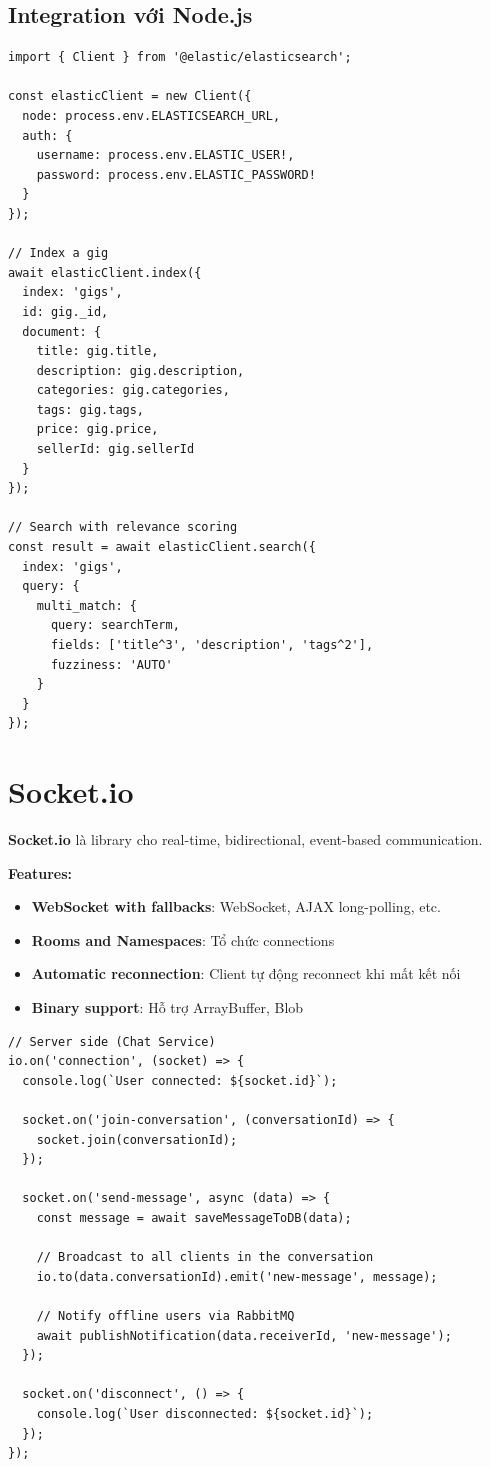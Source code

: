 \documentclass[12pt]{extreport}
\begin{document}
\subsection{Integration với Node.js}

\begin{lstlisting}[style=TypeScriptStyle, caption={Elasticsearch Client}]
import { Client } from '@elastic/elasticsearch';

const elasticClient = new Client({
  node: process.env.ELASTICSEARCH_URL,
  auth: {
    username: process.env.ELASTIC_USER!,
    password: process.env.ELASTIC_PASSWORD!
  }
});

// Index a gig
await elasticClient.index({
  index: 'gigs',
  id: gig._id,
  document: {
    title: gig.title,
    description: gig.description,
    categories: gig.categories,
    tags: gig.tags,
    price: gig.price,
    sellerId: gig.sellerId
  }
});

// Search with relevance scoring
const result = await elasticClient.search({
  index: 'gigs',
  query: {
    multi_match: {
      query: searchTerm,
      fields: ['title^3', 'description', 'tags^2'],
      fuzziness: 'AUTO'
    }
  }
});
\end{lstlisting}

\section{Socket.io}

\textbf{Socket.io} là library cho real-time, bidirectional, event-based communication.

\textbf{Features:}
\begin{itemize}
    \item \textbf{WebSocket with fallbacks}: WebSocket, AJAX long-polling, etc.
    \item \textbf{Rooms and Namespaces}: Tổ chức connections
    \item \textbf{Automatic reconnection}: Client tự động reconnect khi mất kết nối
    \item \textbf{Binary support}: Hỗ trợ ArrayBuffer, Blob
\end{itemize}

\begin{lstlisting}[style=TypeScriptStyle, caption={Socket.io Chat Implementation}]
// Server side (Chat Service)
io.on('connection', (socket) => {
  console.log(`User connected: ${socket.id}`);
  
  socket.on('join-conversation', (conversationId) => {
    socket.join(conversationId);
  });
  
  socket.on('send-message', async (data) => {
    const message = await saveMessageToDB(data);
    
    // Broadcast to all clients in the conversation
    io.to(data.conversationId).emit('new-message', message);
    
    // Notify offline users via RabbitMQ
    await publishNotification(data.receiverId, 'new-message');
  });
  
  socket.on('disconnect', () => {
    console.log(`User disconnected: ${socket.id}`);
  });
});
\end{lstlisting}
\end{document}
